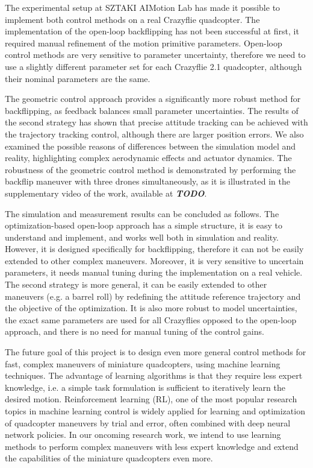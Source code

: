The experimental setup at SZTAKI AIMotion Lab has made it possible to implement both control methods on a real Crazyflie quadcopter. The implementation of the open-loop backflipping has not been successful at first, it required manual refinement of the motion primitive parameters. Open-loop control methods are very sensitive to parameter uncertainty, therefore we need to use a slightly different parameter set for each Crazyflie 2.1 quadcopter, although their nominal parameters are the same. %

The geometric control approach provides a significantly more robust method for backflipping, as feedback balances small parameter uncertainties. The results of the second strategy has shown that precise attitude tracking can be achieved with the trajectory tracking control, although there are larger position errors. We also examined the possible reasons of differences between the simulation model and reality, highlighting complex aerodynamic effects and actuator dynamics. The robustness of the geometric control method is demonstrated by performing the backflip maneuver with three drones simultaneously, as it is illustrated in the supplementary video of the work, available at \textbf{\textit{TODO}}.

The simulation and measurement results can be concluded as follows. The optimization-based open-loop approach has a simple structure, it is easy to understand and implement, and works well both in simulation and reality. However, it is designed specifically for backflipping, therefore it can not be easily extended to other complex maneuvers. Moreover, it is very sensitive to uncertain parameters, it needs manual tuning during the implementation on a real vehicle. The second strategy is more general, it can be easily extended to other maneuvers (e.g. a barrel roll) by redefining the attitude reference trajectory and the objective of the optimization. It is also more robust to model uncertainties, the exact same parameters are used for all Crazyflies opposed to the open-loop approach, and there is no need for manual tuning of the control gains.

The future goal of this project is to design even more general control methods for fast, complex maneuvers of miniature quadcopters, using machine learning techniques. The advantage of learning algorithms is that they require less expert knowledge, i.e. a simple task formulation is sufficient to iteratively learn the desired motion. Reinforcement learning (RL), one of the most popular research topics in machine learning control is widely applied for learning and optimization of quadcopter maneuvers by trial and error, often combined with deep neural network policies. In our oncoming research work, we intend to use learning methods to perform complex maneuvers with less expert knowledge and extend the capabilities of the miniature quadcopters even more.

